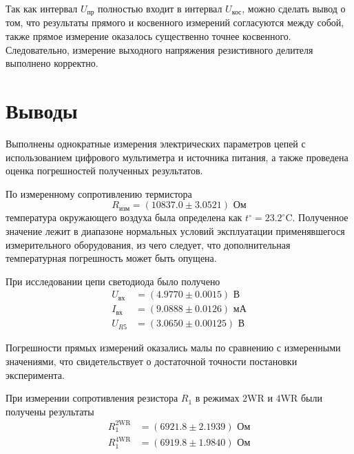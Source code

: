 \documentclass[12pt,a4paper]{article}
\begin{document}
Так как интервал $U_{\text{пр}}$ полностью входит в интервал $U_{\text{кос}}$, можно сделать вывод 
о том, что результаты прямого и косвенного измерений согласуются между собой, также 
прямое измерение оказалось существенно точнее косвенного.
Следовательно, измерение выходного напряжения резистивного делителя выполнено корректно.

\section*{Выводы}

Выполнены однократные измерения электрических параметров
цепей с использованием цифрового мультиметра и источника питания, а также проведена оценка
погрешностей полученных результатов.

По измеренному сопротивлению термистора 
\begin{equation*}
	R_{\text{изм}} = (10837.0 \pm 3.0521)\text{ Ом}
\end{equation*}
температура окружающего воздуха была определена как $t^\circ = 23.2^\circ\text{C}$. Полученное значение
лежит в диапазоне нормальных условий эксплуатации применявшегося измерительного оборудования, из чего 
следует, что дополнительная температурная погрешность может быть опущена.

При исследовании цепи светодиода было получено
\begin{equation*}
	\begin{aligned}
		U_{\text{вх}} &= (4.9770 \pm 0.0015)\text{ В}\\
		I_{\text{вх}} &= (9.0888 \pm 0.0126)\text{ мА}\\
		U_{R5} &= (3.0650 \pm 0.00125)\text{ В}
	\end{aligned}
\end{equation*}

Погрешности прямых измерений оказались малы по сравнению с измеренными значениями, что
свидетельствует о достаточной точности постановки эксперимента.

При измерении сопротивления резистора $R_1$ в режимах $2$WR и $4$WR были получены результаты
\begin{equation*}
	\begin{aligned}
		R_{1}^{2\text{WR}} &= (6921.8 \pm 2.1939)\text{ Ом}\\
		R_{1}^{4\text{WR}} &= (6919.8 \pm 1.9840)\text{ Ом}
	\end{aligned}
\end{equation*}
\end{document}
